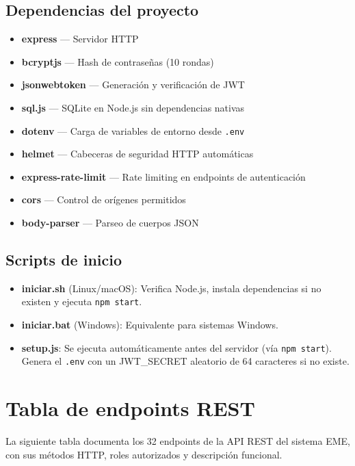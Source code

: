 \documentclass[11pt,a4paper]{article}
\begin{document}
\subsection*{Dependencias del proyecto}

\begin{itemize}
    \item \textbf{express} --- Servidor HTTP
    \item \textbf{bcryptjs} --- Hash de contraseñas (10 rondas)
    \item \textbf{jsonwebtoken} --- Generación y verificación de JWT
    \item \textbf{sql.js} --- SQLite en Node.js sin dependencias nativas
    \item \textbf{dotenv} --- Carga de variables de entorno desde \texttt{.env}
    \item \textbf{helmet} --- Cabeceras de seguridad HTTP automáticas
    \item \textbf{express-rate-limit} --- Rate limiting en endpoints de autenticación
    \item \textbf{cors} --- Control de orígenes permitidos
    \item \textbf{body-parser} --- Parseo de cuerpos JSON
\end{itemize}

\subsection*{Scripts de inicio}

\begin{itemize}
    \item \textbf{iniciar.sh} (Linux/macOS): Verifica Node.js, instala dependencias si no existen y ejecuta \texttt{npm start}.
    \item \textbf{iniciar.bat} (Windows): Equivalente para sistemas Windows.
    \item \textbf{setup.js}: Se ejecuta automáticamente antes del servidor (vía \texttt{npm start}). Genera el \texttt{.env} con un JWT\_SECRET aleatorio de 64 caracteres si no existe.
\end{itemize}

\section{Tabla de endpoints REST}

La siguiente tabla documenta los 32 endpoints de la API REST del sistema EME, con sus métodos HTTP, roles autorizados y descripción funcional.
\end{document}
